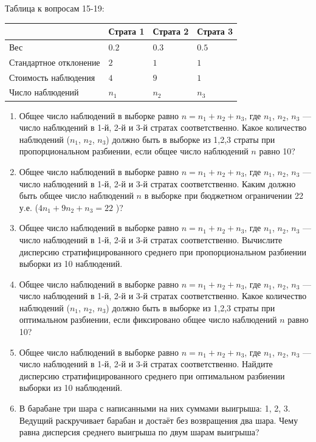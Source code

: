 \documentclass[12pt]{article}
\begin{document}
\newpage
Таблица к вопросам 15-19: 
\begin{center}
\begin{tabular}{@{}llll@{}}
  \toprule
   & Страта 1 & Страта 2 & Страта 3 \\ \midrule
Вес   & $0.2$ & $0.3$ & $0.5$ \\ 
Стандартное отклонение  & $2$ & $1$ & $1$ \\ 
Стоимость наблюдения   & $4$ & $9$ & $1$ \\ 
Число наблюдений      & $n_1$ & $n_2$ & $n_3$ \\ \bottomrule
  \end{tabular}
\end{center}

\begin{enumerate}[resume]
\item Общее число наблюдений в выборке равно $n=n_1 + n_2 + n_3$, где $n_1$, $n_2$, $n_3$ — число наблюдений в 1-й, 2-й и 3-й стратах соответственно.
Какое количество наблюдений ($n_1$, $n_2$, $n_3$) должно быть в выборке из 1,2,3 страты при пропорциональном разбиении, если общее число наблюдений $n$ равно 10?

\item Общее число наблюдений в выборке равно $n=n_1 + n_2 + n_3$, где $n_1$, $n_2$, $n_3$ — число наблюдений в 1-й, 2-й и 3-й стратах соответственно.
Каким должно быть общее число наблюдений $n$ в выборке  при бюджетном ограничении 22 у.е. ($4 n_1 + 9 n_2 + n_3 = 22$ )?

\item Общее число наблюдений в выборке равно $n=n_1 + n_2 + n_3$, где $n_1$, $n_2$, $n_3$ — число наблюдений в 1-й, 2-й и 3-й стратах соответственно.
Вычислите дисперсию стратифицированного среднего при пропорциональном разбиении выборки из 10 наблюдений.

\item Общее число наблюдений в выборке равно $n=n_1 + n_2 + n_3$, где $n_1$, $n_2$, $n_3$ — число наблюдений в 1-й, 2-й и 3-й стратах соответственно.
Какое количество наблюдений ($n_1$, $n_2$, $n_3$) должно быть в выборке из 1,2,3 страты при оптимальном разбиении, если фиксировано общее число наблюдений $n$ равно 10?

\item Общее число наблюдений в выборке равно $n=n_1 + n_2 + n_3$, где $n_1$, $n_2$, $n_3$ — число наблюдений в 1-й, 2-й и 3-й стратах соответственно.
Найдите дисперсию стратифицированного среднего при оптимальном  разбиении выборки из 10 наблюдений.

\item В барабане три шара с написанными на них суммами выигрыша: 1, 2, 3. 
Ведущий раскручивает барабан и достаёт без возвращения два шара. 
Чему равна дисперсия среднего выигрыша по двум шарам выигрыша?
\end{enumerate}
\end{document}
